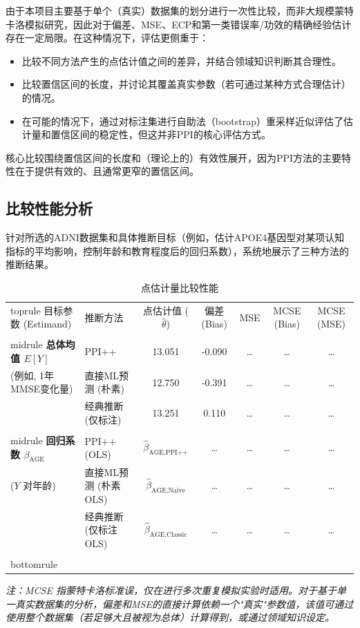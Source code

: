 \documentclass[12pt,a4paper]{article}
\begin{document}
由于本项目主要基于单个（真实）数据集的划分进行一次性比较，而非大规模蒙特卡洛模拟研究，因此对于偏差、MSE、ECP和第一类错误率/功效的精确经验估计存在一定局限。在这种情况下，评估更侧重于：
\begin{itemize}
    \item 比较不同方法产生的点估计值之间的差异，并结合领域知识判断其合理性。
    \item 比较置信区间的长度，并讨论其覆盖真实参数（若可通过某种方式合理估计）的情况。
    \item 在可能的情况下，通过对标注集进行自助法（bootstrap）重采样近似评估了估计量和置信区间的稳定性，但这并非PPI的核心评估方式。
\end{itemize}
核心比较围绕置信区间的长度和（理论上的）有效性展开，因为PPI方法的主要特性在于提供有效的、且通常更窄的置信区间。

\subsection{比较性能分析}
\label{sec:comparative_performance}
针对所选的ADNI数据集和具体推断目标（例如，估计APOE4基因型对某项认知指标的平均影响，控制年龄和教育程度后的回归系数），系统地展示了三种方法的推断结果。

\begin{table}[H]
    \centering
    \caption{点估计量比较性能}
    \label{tab:point_estimator_comparison}
    \small
    \begin{tabular}{@{}llccccc@{}}
        \\toprule
        目标参数 (Estimand) & 推断方法 & 点估计值 ($\hat{\theta}$) & 偏差 (Bias) & MSE & MCSE (Bias) & MCSE (MSE) \\
        \\midrule
        \textbf{总体均值 $E[Y]$} & PPI++ & 13.051 & -0.090 & \dots & \dots & \dots \\
        (例如, 1年MMSE变化量) & 直接ML预测 (朴素) & 12.750 & -0.391 & \dots & \dots & \dots \\
         & 经典推断 (仅标注) & 13.251 & 0.110 & \dots & \dots & \dots \\
        \\midrule
        \textbf{回归系数 $\beta_{\text{AGE}}$} & PPI++ (OLS) & $\hat{\beta}_{\text{AGE,PPI++}}$ & \dots & \dots & \dots & \dots \\
        ($Y$ 对年龄) & 直接ML预测 (朴素 OLS) & $\hat{\beta}_{\text{AGE,Naive}}$ & \dots & \dots & \dots & \dots \\
         & 经典推断 (仅标注 OLS) & $\hat{\beta}_{\text{AGE,Classic}}$ & \dots & \dots & \dots & \dots \\
        \\bottomrule
    \end{tabular}
    \parbox{\\linewidth}{\footnotesize \textit{注：MCSE 指蒙特卡洛标准误，仅在进行多次重复模拟实验时适用。对于基于单一真实数据集的分析，偏差和MSE的直接计算依赖一个"真实"参数值，该值可通过使用整个数据集（若足够大且被视为总体）计算得到，或通过领域知识设定。}}
\end{table}
\end{document}
